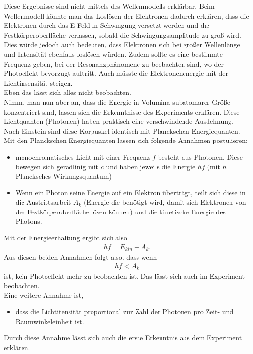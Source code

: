 Diese Ergebnisse sind nicht mittels des Wellenmodells erklärbar. 
Beim Wellenmodell könnte man das Loslösen der Elektronen dadurch
erklären, dass die Elektronen durch das E-Feld in Schwingung versetzt
werden und die Festkörperoberfläche verlassen, sobald die Schwingungsamplitude
zu groß wird. Dies würde jedoch auch bedeuten, dass Elektronen sich
bei großer Wellenlänge und Intensität ebenfalls loslösen würden. Zudem
sollte es eine bestimmte Frequenz geben, bei der Resonanzphänomene zu beobachten
sind, wo der Photoeffekt bevorzugt auftritt. Auch müsste die Elektronenenergie
mit der Lichtinsensität steigen.\\
Eben das lässt sich alles nicht beobachten.\\
Nimmt man nun aber an, dass die Energie in Volumina subatomarer
Größe konzentriert sind, lassen sich die Erkenntnisse des Experiments
erklären. Diese Lichtquanten (Photonen) haben praktisch eine verschwindende
Ausdehnung.\\
Nach Einstein sind diese Korpuskel identisch mit Planckschen Energiequanten.\\
Mit den Planckschen Energiequanten lassen sich folgende Annahmen postulieren:
\begin{itemize}
    \item monochromatisches Licht mit einer Frequenz $f$ besteht aus Photonen. Diese bewegen sich geradlinig mit $c$ und haben jeweils die Energie $hf$ (mit $h=$ Plancksches Wirkungsquantum)
    \item Wenn ein Photon seine Energie auf ein Elektron überträgt, teilt sich diese in die Austrittsarbeit $A_k$ 
    (Energie die benötigt wird, damit sich Elektronen von der Festkörperoberfläche lösen können) und die kinetische Energie des Photons.
\end{itemize}
Mit der Energieerhaltung ergibt sich also
\begin{align}
\label{eqn:Energiebilanz}
    hf = E_{kin} + A_k.
\end{align}
Aus diesen beiden Annahmen folgt also, dass wenn 
\begin{align}
\label{eqn:hf_kleiner}
    hf < A_k
\end{align}
ist, kein Photoeffekt
mehr zu beobachten ist. Das lässt sich auch im Experiment beobachten.\\
Eine weitere Annahme ist,
\begin{itemize}
    \item dass die Lichtitensität proportional zur Zahl der Photonen 
pro Zeit- und Raumwinkeleinheit ist.
\end{itemize}
Durch diese Annahme lässt sich auch die erste Erkenntnis aus dem Experiment
erklären.\\


